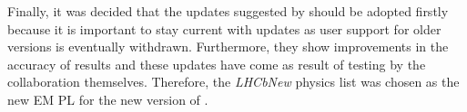 Finally, it was decided that the updates suggested by \geant should be adopted firstly because it is important to stay current with \geant updates as user support for older versions is eventually withdrawn.  Furthermore, they show improvements in the accuracy of results and these updates have come as result of testing by the \geant collaboration themselves.  Therefore, the \textit{LHCbNew} physics list was chosen as the new EM PL for the new version of \gauss.





\clearpage

